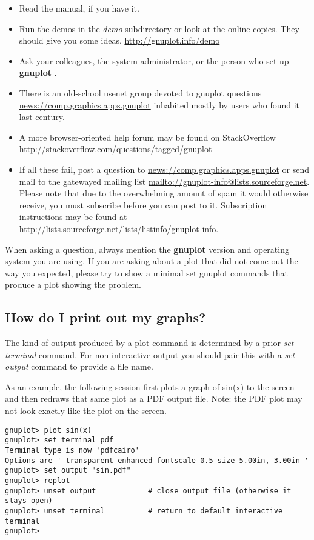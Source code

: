 \documentclass[a4paper,11pt]{article}
\def\http#1{{\small\href{http://#1}{\url{http://#1}}}}
\def\mailto#1{{\small\href{mailto://#1}{\url{mailto://#1}}}}
\def\news#1{\href{news://#1}{\url{news://#1}}}
\newcommand{\news}[1]%
            {\def~{\~{}}\htmladdnormallink{\latex{\url{#1}}\html{\textit{#1}}}%
                {news:#1}%
            }
\newcommand{\mailto}[1]%
            {\htmladdnormallink{\latex{\url{<#1>}}\html{\textit{#1}}}%
                {mailto:#1}%
            }
\newcommand{\http}[1]%
            {\htmladdnormallink{\latex{\url{http://#1}}%
                    \html{\textit{http://#1}}}%
                {http://#1}%
            }
\newcommand{\gnuplot}{\textbf{gnuplot }}
\begin{document}
\begin{itemize}
\item
Read the manual, if you have it.

\item
Run the demos in the {\em demo} subdirectory or look at the
online copies. They should give you some ideas.
\http{gnuplot.info/demo}

\item
Ask your colleagues, the system administrator, or the person who
set up \gnuplot.

\item
There is an old-school usenet group devoted to gnuplot questions
\news{comp.graphics.apps.gnuplot}
inhabited mostly by users who found it last century.

\item
A more browser-oriented help forum may be found on StackOverflow
\http{stackoverflow.com/questions/tagged/gnuplot}

\item
If all these fail, post a question to \news{comp.graphics.apps.gnuplot} or send mail
to the gatewayed mailing list \mailto{gnuplot-info@lists.sourceforge.net}.
Please note that due to the overwhelming amount of spam it would otherwise receive,
you must subscribe before you can post to it. Subscription instructions
may be found at
\http{lists.sourceforge.net/lists/listinfo/gnuplot-info}.

\end{itemize}
When asking a question, always mention the \gnuplot version and
operating system you are using.  If you are asking about a plot that
did not come out the way you expected, please try to show a minimal
set gnuplot commands that produce a plot showing the problem.


\subsection{How do I print out my graphs?}

The kind of output produced by a plot command is determined by a
prior {\em set terminal} command.  For non-interactive output
you should pair this with a {\em set output} command to provide
a file name.

As an example, the following session first plots a graph of sin(x) to the
screen and then redraws that same plot as a PDF output file.
Note: the PDF plot may not look exactly like the plot on the screen.

\small
\begin{verbatim}
gnuplot> plot sin(x)
gnuplot> set terminal pdf
Terminal type is now 'pdfcairo'
Options are ' transparent enhanced fontscale 0.5 size 5.00in, 3.00in '
gnuplot> set output "sin.pdf"
gnuplot> replot
gnuplot> unset output            # close output file (otherwise it stays open)
gnuplot> unset terminal          # return to default interactive terminal
gnuplot>
\end{verbatim}
\normalsize
\end{document}
